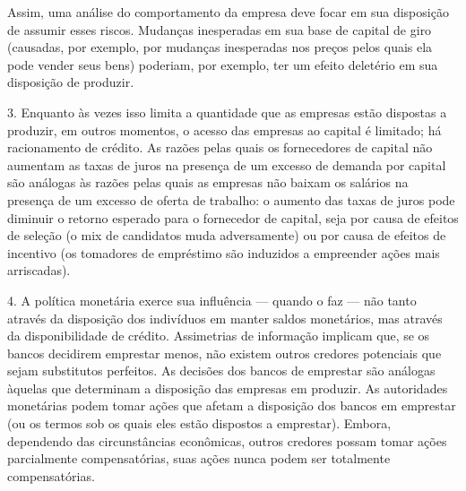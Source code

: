 \documentclass[12pt]{article}
\begin{document}
Assim, uma análise do comportamento da empresa deve focar em sua disposição de assumir esses riscos. Mudanças inesperadas em sua base de capital de giro (causadas, por exemplo, por mudanças inesperadas nos preços pelos quais ela pode vender seus bens) poderiam, por exemplo, ter um efeito deletério em sua disposição de produzir.

3. Enquanto às vezes isso limita a quantidade que as empresas estão dispostas a produzir, em outros momentos, o acesso das empresas ao capital é limitado; há racionamento de crédito. As razões pelas quais os fornecedores de capital não aumentam as taxas de juros na presença de um excesso de demanda por capital são análogas às razões pelas quais as empresas não baixam os salários na presença de um excesso de oferta de trabalho: o aumento das taxas de juros pode diminuir o retorno esperado para o fornecedor de capital, seja por causa de efeitos de seleção (o mix de candidatos muda adversamente) ou por causa de efeitos de incentivo (os tomadores de empréstimo são induzidos a empreender ações mais arriscadas).

4. A política monetária exerce sua influência — quando o faz — não tanto através da disposição dos indivíduos em manter saldos monetários, mas através da disponibilidade de crédito. Assimetrias de informação implicam que, se os bancos decidirem emprestar menos, não existem outros credores potenciais que sejam substitutos perfeitos. As decisões dos bancos de emprestar são análogas àquelas que determinam a disposição das empresas em produzir. As autoridades monetárias podem tomar ações que afetam a disposição dos bancos em emprestar (ou os termos sob os quais eles estão dispostos a emprestar). Embora, dependendo das circunstâncias econômicas, outros credores possam tomar ações parcialmente compensatórias, suas ações nunca podem ser totalmente compensatórias.
\end{document}
